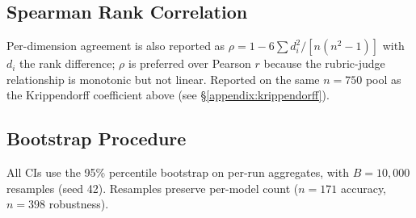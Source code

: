 \subsection{Spearman Rank Correlation}

Per-dimension agreement is also reported as
$\rho = 1 - 6 \sum d_i^2 / [n(n^2 - 1)]$ with $d_i$ the rank
difference; $\rho$ is preferred over Pearson $r$ because the
rubric-judge relationship is monotonic but not linear. Reported
on the same $n=750$ pool as the Krippendorff coefficient above
(see \S\ref{appendix:krippendorff}).

\subsection{Bootstrap Procedure}

All CIs use the 95\% percentile bootstrap on per-run aggregates,
with $B = 10{,}000$ resamples (seed 42). Resamples preserve
per-model count ($n=171$ accuracy, $n=398$ robustness).
